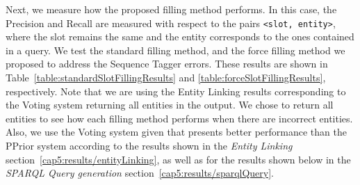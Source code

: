 Next, we measure how the proposed filling method performs. In this case, the Precision and Recall 
are measured with respect to the pairs \texttt{<slot, entity>}, where the slot remains the same 
and the entity corresponds to the ones contained in a \SPARQL{} query. We test the standard filling 
method, and the force filling method we proposed to address the Sequence Tagger errors. These 
results are shown in Table~\ref{table:standardSlotFillingResults} and \ref{table:forceSlotFillingResults}, 
respectively. Note that we are using the Entity Linking results corresponding to the Voting system 
returning all entities in the output. We chose to return all entities to see how each filling
method performs when there are incorrect entities. Also, we use the Voting system given that
presents better performance than the PPrior system according to the results shown in the 
\textit{Entity Linking} section~\ref{cap5:results/entityLinking}, as well as for the results shown 
below in the \textit{SPARQL Query generation} section~\ref{cap5:results/sparqlQuery}.

